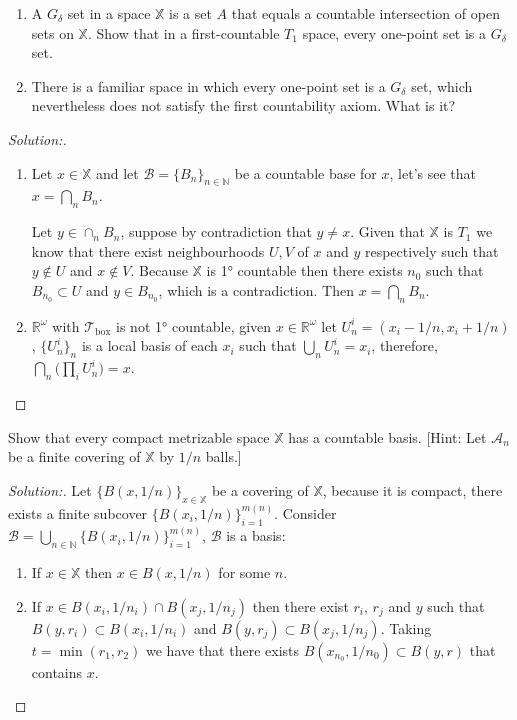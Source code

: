 \documentclass[a4paper,12pt, reqno]{article}
\theoremstyle{definition}
\newenvironment{exerr}[1]{
  \renewcommand\theexeralt{#1}
  \exeralt
}{\endexeralt}
\newenvironment{solution}{\begin{proof}[Solution:]}{\end{proof}}
\newcommand{\R}{\mathbb{R}}
\newcommand{\T}{\mathscr{T}}
\newcommand{\A}{\mathscr{A}}
\newcommand{\B}{\mathscr{B}}
\newcommand{\N}{\mathbb{N}}
\newcommand{\X}{\mathbb{X}}
\begin{document}
\begin{exerr}{1}\hfill
  \begin{enumerate}[label=(\alph*)]
    \item A $G_{\delta}$ set in a space $\X$ is a set $A$ that equals a countable intersection of open sets on $\X$. Show that in a first-countable $T_{1}$ space, every one-point set is a $G_{\delta}$ set.
    \item There is a familiar space in which every one-point set is a $G_{\delta}$ set, which nevertheless does not satisfy the first countability axiom. What is it?
  \end{enumerate}
\end{exerr}
\begin{solution}\hfill
  \begin{enumerate}[label=(\alph*)]
    \item Let $x\in\X$ and let $\B = \{ B_{n} \}_{n\in\N}$ be a countable base for $x$, let's see that $x = \bigcap_{n}B_{n}$.
    
    Let $y\in\cap_{n}B_{n}$, suppose by contradiction that $y\neq x$. Given that $\X$ is $T_{1}$ we know that there exist neighbourhoods $U,V$ of $x$ and $y$ respectively such that $y\notin U$ and $x\notin V$. Because $\X$ is 1° countable then there exists $n_{0}$ such that $B_{n_{0}}\subset U$ and $y\in B_{n_{0}}$, which is a contradiction. Then $x = \bigcap_{n}B_{n}$.
    \item $\R^\omega$ with $\T_{\text{box}}$ is not 1° countable, given $x\in\R^\omega$ let $U_{n}^i = (x_{i}-1/n, x_{i}+1/n)$, $\{ U_{n}^i \}_{n}$ is a local basis of each $x_{i}$ such that $\bigcup_{n}U_{n}^i = x_{i}$, therefore, $\bigcap_{n}\big( \prod_{i}U_{n}^i \big) = x$.
   \end{enumerate}
\end{solution}

\begin{exerr}{4}
  Show that every compact metrizable space $\X$ has a countable basis. [Hint: Let $\A_{n}$ be a finite covering of $\X$ by $1/n$ balls.]
\end{exerr}
\begin{solution}
  Let $\{ B(x,1/n) \}_{x\in\X}$ be a covering of $\X$, because it is compact, there exists a finite subcover $\{ B(x_{i},1/n) \}_{i=1}^{m(n)}$. Consider $\B = \bigcup_{n\in\N}\{ B(x_{i},1/n) \}_{i=1}^{m(n)}$, $\B$ is a basis:
  \begin{enumerate}
    \item If $x\in\X$ then $x\in B(x,1/n)$ for some $n$.
    \item If $x\in B(x_{i},1/n_{i})\cap B(x_{j},1/n_{j})$ then there exist $r_{i}$, $r_{j}$ and $y$ such that $B(y,r_{i})\subset B(x_{i},1/n_{i})$ and $B(y,r_{j})\subset B(x_{j},1/n_{j})$. Taking $t = \min(r_{1},r_{2})$ we have that there exists $B(x_{n_{0}},1/n_{0}) \subset B(y,r)$ that contains $x$.
  \end{enumerate}
\end{solution}
\end{document}
